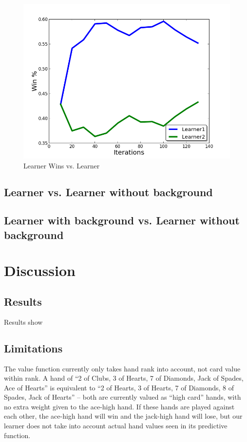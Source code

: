 \documentclass[12pt,pdftex]{article}
\begin{document}
\begin{figure}[ht!]
	\begin{center}
		\includegraphics[scale=0.5]{figs/learnervlearner.png}
		\caption{Learner Wins vs. Learner}
		\label{fig:learn_v_learn}
\end{center}
\end{figure}

\subsection{Learner vs. Learner without background}

\subsection{Learner with background vs. Learner without background}
\section{Discussion}
\subsection{Results}
Results show

\subsection{Limitations}   The value function currently only takes hand rank into account, not card value within rank. A hand of ``2 of Clubs, 3 of Hearts, 7 of Diamonds, Jack of Spades, Ace of Hearts'' is equivalent to ``2 of Hearts, 3 of Hearts, 7 of Diamonds, 8 of Spades, Jack of Hearts'' -- both are currently valued as ``high card'' hands, with no extra weight given to the ace-high hand. 
If these hands are played against each other, the ace-high hand will win and the jack-high hand will lose, but our learner does not take into account actual hand values seen in its predictive function.
\end{document}
